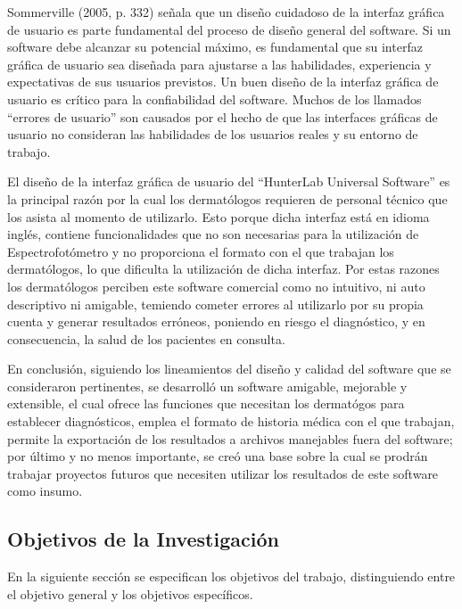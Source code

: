 \documentclass[12pt, a4paper]{article}
\begin{document}
Sommerville (2005, p. 332) se\~{n}ala que un dise\~{n}o cuidadoso de la interfaz gr\'{a}fica de usuario es parte fundamental del proceso de dise\~{n}o general del software. Si un software debe alcanzar su potencial m\'{a}ximo, es fundamental que su interfaz gr\'{a}fica de usuario sea dise\~{n}ada para ajustarse a las habilidades, experiencia y expectativas de sus usuarios previstos. Un buen dise\~{n}o de la interfaz gr\'{a}fica de usuario es cr\'{i}tico para la confiabilidad del software. Muchos de los llamados ``errores de usuario'' son causados por el hecho de que las interfaces gr\'{a}ficas de usuario no consideran las habilidades de los usuarios reales y su entorno de trabajo.

El dise\~{n}o de la interfaz gr\'{a}fica de usuario del ``HunterLab Universal Software'' es la principal raz\'{o}n por la cual los dermat\'{o}logos requieren de personal t\'{e}cnico que los asista al momento de utilizarlo. Esto porque dicha interfaz est\'{a} en idioma ingl\'{e}s, contiene funcionalidades que no son necesarias para la utilizaci\'{o}n de Espectrofot\'{o}metro y no proporciona el formato con el que trabajan los dermat\'{o}logos, lo que dificulta la utilizaci\'{o}n de dicha interfaz. Por estas razones los dermat\'{o}logos perciben este software comercial como no intuitivo, ni auto descriptivo ni amigable, temiendo cometer errores al utilizarlo por su propia cuenta y generar resultados err\'{o}neos, poniendo en riesgo el diagn\'{o}stico, y en consecuencia, la salud de los pacientes en consulta.

En conclusi\'{o}n, siguiendo los lineamientos del dise\~{n}o y calidad del software que se consideraron pertinentes, se desarroll\'{o} un software amigable, mejorable y extensible, el cual ofrece las funciones que necesitan los dermat\'{o}gos para establecer diagn\'{o}sticos, emplea el formato de historia m\'{e}dica con el que trabajan, permite la exportaci\'{o}n de los resultados a archivos manejables fuera del software; por \'{u}ltimo y no menos importante, se cre\'{o} una base sobre la cual se prodr\'{a}n trabajar proyectos futuros que necesiten utilizar los resultados de este software como insumo.

\pagebreak

\subsection{Objetivos de la Investigaci\'{o}n}
En la siguiente secci\'{o}n se especifican los objetivos del trabajo, distinguiendo entre el objetivo general y los objetivos espec\'{i}ficos.
\end{document}
